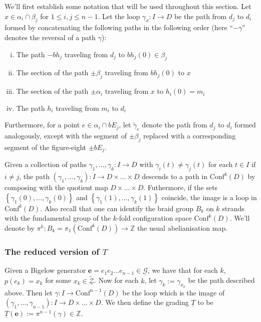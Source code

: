 \documentclass[11pt]{article}
\theoremstyle{plain} \newtheorem{thm}{Theorem}[subsection]
\theoremstyle{plain} \newtheorem{cor}[thm]{Corollary}
\theoremstyle{plain} \newtheorem{prop}[thm]{Proposition}
\theoremstyle{plain} \newtheorem{conj}[thm]{Conjecture}
\theoremstyle{plain} \newtheorem{lem}[thm]{Lemma}
\theoremstyle{definition} \newtheorem{df}[thm]{Definition}
\theoremstyle{remark} \newtheorem{rmk}[thm]{Remark}
\theoremstyle{remark} \newtheorem{obs}[thm]{Observation}
\newcommand{\Ztil}{\tld{\mathcal{Z}}}
\newcommand{\G}{\mathcal{G}}
\newcommand{\tld}[1]{\widetilde{#1}}
\newcommand{\red}[1]{\underline{#1}}
\newcommand{\be}{\mathbf{e}}
\numberwithin{equation}{section}
\begin{document}
We'll first establish some notation that will be used throughout this section.  Let $x \in \alpha_i \cap \beta_j$ for $1 \leq i,j \leq n-1$.  Let the loop $\gamma_x:I \rightarrow D$ be the path from $d_j$ to $d_i$ formed by concatenating the following paths in the following order (here ``$-\gamma$'' denotes the reversal of a path $\gamma$):
\begin{enumerate}[(i)]
\item The path $-bh_j$  traveling from $d_j$ to $bh_j(0) \in \beta_j$
\item The section of the path $\pm \beta_j$ traveling from $bh_j(0)$ to $x$
\item The section of the path $\pm\alpha_i$ traveling from $x$ to $h_i(0) = m_i$
\item The path $h_i$ traveling from $m_i$ to $d_i$
\end{enumerate}

Furthermore, for a point $e \in \alpha_i \cap bE_j$, let $\tld{\gamma}_e$ denote the path from $d_j$ to $d_i$ formed analogously, except with the segment of $\pm \beta_j$ replaced with a corresponding segment of the figure-eight $\pm bE_j$.

Given a collection of paths $\gamma_1, \ldots, \gamma_k: I \rightarrow D$ with $\gamma_{i}(t) \neq \gamma_j(t)$  for each $t \in I$ if $i \neq j$, the path $(\gamma_1, \ldots, \gamma_k):I \rightarrow D \times \ldots \times D$ descends to a path in $\text{Conf}^{k}(D)$ by composing with the quotient map $D \times \ldots \times D$.  Futhermore, if the sets $\left\{ \gamma_1(0), \ldots, \gamma_{k}(0) \right\}$ and $\left\{ \gamma_1(1), \ldots, \gamma_{k}(1) \right\}$ coincide, the image is a loop in $\text{Conf}^k(D)$.  Also recall that one can identify the braid group $B_k$ on $k$ strands with the fundamental group of the $k$-fold configuration space $\text{Conf}^k(D)$.  We'll denote by $\pi^{k}: B_k = \pi_1\left(\text{Conf}^k(D)\right) \rightarrow \mathbb{Z}$ the usual abelianisation map.

\subsubsection{The reduced version of $T$}\label{sec:Tdef}
Given a Bigelow generator $\be = e_{1} e_{2} \ldots e_{n-1}  \in \red{\G}$, we have that for each $k$, $p(e_k) = x_k$ for some $x_{k} \in \red{\Ztil}$.  Now for each $k$, let $\gamma_k:=\gamma_{x_k}$ be the path described above.  Then let $\gamma: I \rightarrow \text{Conf}^{n-1}(D)$ be the loop which is the image of $(\gamma_1, \ldots, \gamma_{n-1}):I \rightarrow D \times \ldots \times D$.  We then define the grading $\red{T}$ to be $\red{T}(\be) := \pi^{n-1}(\gamma) \in \mathbb{Z}$.
\end{document}
